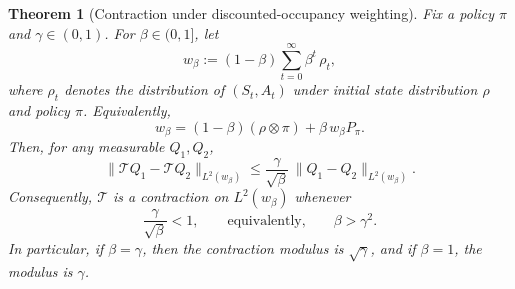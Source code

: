 \documentclass{article}
\theoremstyle{plain}
\newtheorem{theorem}{Theorem}
\theoremstyle{definition}
\theoremstyle{remark}
\begin{document}
\begin{theorem}[Contraction under discounted-occupancy weighting]
\label{thm:discounted-occ-contraction}
Fix a policy \(\pi\) and \(\gamma\in(0,1)\). For \(\beta\in(0,1]\), let
\[
w_\beta
:=
(1-\beta)\sum_{t=0}^\infty \beta^t\,\rho_t,
\]
where \(\rho_t\) denotes the distribution of \((S_t,A_t)\) under initial
state distribution \(\rho\) and policy \(\pi\). Equivalently,
\[
w_\beta=(1-\beta)(\rho\otimes\pi)+\beta\,w_\beta P_\pi.
\]
Then, for any measurable \(Q_1,Q_2\),
\[
\|\mathcal T Q_1-\mathcal T Q_2\|_{L^2(w_\beta)}
\le
\frac{\gamma}{\sqrt{\beta}}\,
\|Q_1-Q_2\|_{L^2(w_\beta)}.
\]
Consequently, \(\mathcal T\) is a contraction on \(L^2(w_\beta)\) whenever
\[
\frac{\gamma}{\sqrt{\beta}}<1,
\qquad\text{equivalently,}\qquad
\beta>\gamma^2.
\]
In particular, if \(\beta=\gamma\), then the contraction modulus is
\(\sqrt{\gamma}\), and if \(\beta=1\), the modulus is \(\gamma\).
\end{theorem}
\end{document}
